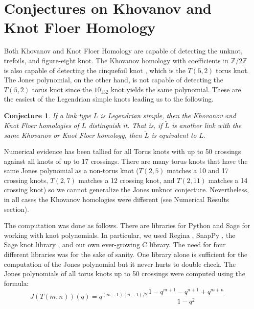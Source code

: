 \documentclass{article}
\theoremstyle{plain}
\newtheorem{conjecture}{Conjecture}
\begin{document}
    \section{Conjectures on Khovanov and Knot Floer Homology}
        Both Khovanov and Knot Floer Homology are capable of detecting the
        unknot, trefoils, and figure-eight knot. The Khovanov homology with
        coefficients in $\mathbb{Z}/2\mathbb{Z}$ is also capable of detecting
        the cinquefoil knot \cite{BaldwinYingSivekCinquefoilKhovanov},
        which is the $T(5,2)$ torus knot. The Jones
        polynomial, on the other hand, is not capable of detecting the
        $T(5,2)$ torus knot since the $10_{132}$ knot yields the same
        polynomial. These are the easiest of the Legendrian simple knots
        leading us to the following.
        \begin{conjecture}
            If a link type $L$ is Legendrian simple, then the Khovanov and Knot
            Floer homologies of $L$ distinguish it. That is, if $\tilde{L}$
            is another link with the same Khovanov or Knot Floer homology,
            then $\tilde{L}$ is equivalent to $L$.
        \end{conjecture}
        Numerical evidence has been tallied for all Torus knots with up to 50
        crossings against all knots of up to 17 crossings. There are many
        torus knots that have the same Jones polynomial as a non-torus knot
        ($T(2,5)$ matches a 10 and 17 crossing knots, $T(2,7)$
        matches a 12 crossing knot, and $T(2,11)$ matches a 14 crossing knot)
        so we cannot generalize the Jones unknot conjecture. Nevertheless, in
        all cases the Khovanov homologies were different
        (see Numerical Results section).
        \par\hfill\par
        The computation was done as follows. There are libraries for Python and
        Sage for working with knot polynomials. In particular, we used
        Regina \cite{regina}, SnapPy \cite{SnapPy}, the Sage knot library
        \cite{sage}, and our own ever-growing C library. The need for four
        different libraries was for the sake of sanity. One library alone is
        sufficient for the computation of the Jones polynomial but it never
        hurts to double check. The Jones polynomials of all torus knots up to
        50 crossings were computed using the formula:
        \begin{equation}
            \label{eqn:jones_poly_torus}%
            J(T(m,n))(q)=q^{(m-1)(n-1)/2}
                \frac{1-q^{m+1}-q^{n+1}+q^{m+n}}{1-q^{2}}
        \end{equation}
\end{document}
